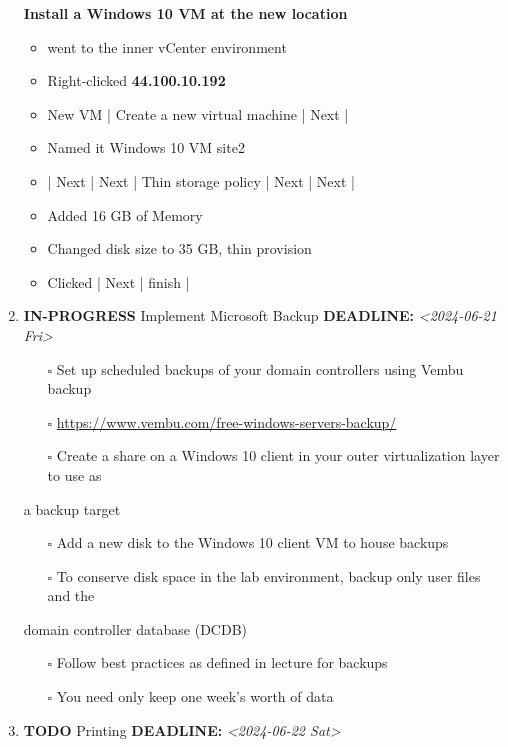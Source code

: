 \documentclass[letterpaper]{article}
\begin{document}
\begin{enumerate}
\textbf{Install a Windows 10 VM at the new location}
\begin{itemize}
\item went to the inner vCenter environment
\item Right-clicked \textbf{44.100.10.192}
\item New VM | Create a new virtual machine | Next |
\item Named it Windows 10 VM site2
\item | Next | Next | Thin storage policy | Next | Next |
\item Added 16 GB of Memory
\item Changed disk size to 35 GB, thin provision
\item Clicked | Next | finish |
\end{itemize}
\item {\bfseries\sffamily IN-PROGRESS} Implement Microsoft Backup
\label{sec:org11b6620}
\noindent\textbf{DEADLINE:} \textit{<2024-06-21 Fri>}\\[0pt]
\begin{itemize}
\item[{$\square$}] Set up scheduled backups of your domain controllers using Vembu backup
\item[{$\square$}] \url{https://www.vembu.com/free-windows-servers-backup/}
\item[{$\square$}] Create a share on a Windows 10 client in your outer virtualization layer to use as
\end{itemize}
a backup target
\begin{itemize}
\item[{$\square$}] Add a new disk to the Windows 10 client VM to house backups
\end{itemize}
\begin{itemize}
\item[{$\square$}] To conserve disk space in the lab environment, backup only user files and the
\end{itemize}
domain controller database (DCDB)
\begin{itemize}
\item[{$\square$}] Follow best practices as defined in lecture for backups
\item[{$\square$}] You need only keep one week’s worth of data
\end{itemize}
\item {\bfseries\sffamily TODO} Printing
\label{sec:orga587abf}
\noindent\textbf{DEADLINE:} \textit{<2024-06-22 Sat>}\\[0pt]

\end{enumerate}
\end{document}
